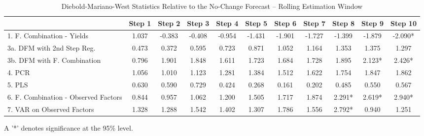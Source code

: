 \documentclass[11pt]{article}
\begin{document}
\clearpage
\begin{table}   \caption{Diebold-Mariano-West Statistics Relative to the No-Change Forecast -- Rolling Estimation Window}                                                                                             
\center                                                                                                     
\begin{tabular}{|l|c|c|c|c|c|c|c|c|c|c|}                                                                    
\hline                                                                                                      
&Step 1 &Step 2 &Step 3 &Step 4 &Step 5 &Step 6 &Step 7 &Step 8 &Step 9 &Step 10\\                          
\hline                                                                                                      
1. F. Combination - Yields          &1.037&-0.383&-0.408&-0.954&-1.431&-1.901&-1.727&-1.399&-1.879&-2.090*\\
3a. DFM with 2nd Step Reg.          &0.473&0.372&0.595&0.723&0.871&1.052&1.164&1.353&1.375&1.297\\          
3b. DFM with F. Combination         &0.796&1.901&1.848&1.611&1.723&1.684&1.728&1.895&2.123*&2.426*\\        
4. PCR                              &1.056&1.010&1.123&1.281&1.384&1.512&1.622&1.754&1.847&1.862\\          
5. PLS                              &0.630&0.590&0.729&0.424&0.268&0.161&0.202&0.485&0.550&0.567\\          
6. F. Combination - Observed Factors&0.844&0.957&1.062&1.200&1.505&1.717&1.874&2.291*&2.619*&2.940*\\       
7. VAR on Observed Factors          &1.328&1.288&1.542&1.402&1.307&1.786&1.556&2.792*&0.940&1.251\\         
\hline                                                                                                      
\end{tabular}
\footnotesize A '*' denotes significance at the 95\% level.                                                                                               
\end{table}  
\end{document}
